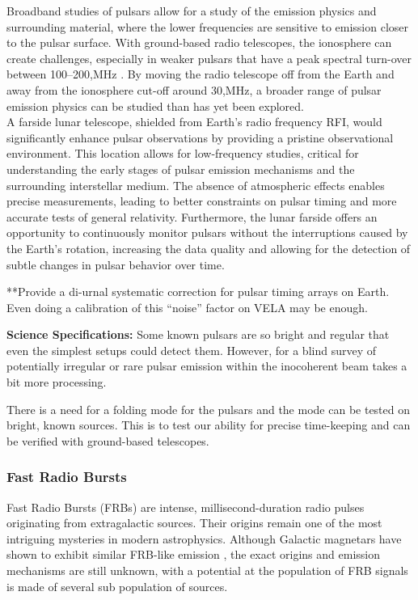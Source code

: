 Broadband studies of pulsars allow for a study of the emission physics and surrounding material, where the lower frequencies are sensitive to emission closer to the pulsar surface. With ground-based radio telescopes, the ionosphere can create challenges, especially in weaker pulsars that have a peak spectral turn-over between 100--200,MHz \citep{Stappers_2011}. By moving the radio telescope off from the Earth and away from the ionosphere cut-off around 30,MHz, a broader range of pulsar emission physics can be studied than has yet been explored.\\

A farside lunar telescope, shielded from Earth’s radio frequency RFI, would significantly enhance pulsar observations by providing a pristine observational environment. This location allows for low-frequency studies, critical for understanding the early stages of pulsar emission mechanisms and the surrounding interstellar medium. The absence of atmospheric effects enables precise measurements, leading to better constraints on pulsar timing and more accurate tests of general relativity. Furthermore, the lunar farside offers an opportunity to continuously monitor pulsars without the interruptions caused by the Earth’s rotation, increasing the data quality and allowing for the detection of subtle changes in pulsar behavior over time.

**Provide a di-urnal systematic correction for pulsar timing arrays on Earth. Even doing a calibration of this “noise” factor on VELA may be enough.

\textbf{Science Specifications:} Some known pulsars are so bright and regular that even the simplest setups could detect them. However, for a blind survey of potentially irregular or rare pulsar emission within the inocoherent beam takes a bit more processing. 

There is a need for a folding mode for the pulsars and the mode can be tested on bright, known sources. This is to test our ability for precise time-keeping and can be verified with ground-based telescopes.



\subsubsection{Fast Radio Bursts}
Fast Radio Bursts (FRBs) are intense, millisecond-duration radio pulses originating from extragalactic sources. Their origins remain one of the most intriguing mysteries in modern astrophysics. Although Galactic magnetars have shown to exhibit similar FRB-like emission \citep{BC_2020}, the exact origins and emission mechanisms are still unknown, with a potential at the population of FRB signals is made of several sub population of sources.  \\ 

